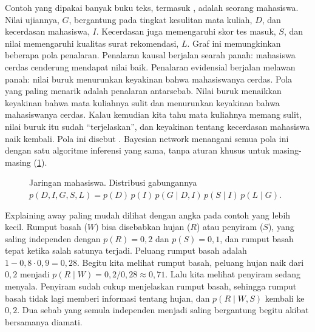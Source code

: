 Contoh yang dipakai banyak buku teks, termasuk \citet{koller2009}, adalah seorang mahasiswa. Nilai
ujiannya, $G$, bergantung pada tingkat kesulitan mata kuliah, $D$, dan kecerdasan mahasiswa, $I$.
Kecerdasan juga memengaruhi skor tes masuk, $S$, dan nilai memengaruhi kualitas surat rekomendasi,
$L$. Graf ini memungkinkan beberapa pola penalaran. Penalaran kausal berjalan searah panah: mahasiswa
cerdas cenderung mendapat nilai baik. Penalaran evidensial berjalan melawan panah: nilai buruk
menurunkan keyakinan bahwa mahasiswanya cerdas. Pola yang paling menarik adalah penalaran
antarsebab. Nilai buruk menaikkan keyakinan bahwa mata kuliahnya sulit dan menurunkan keyakinan
bahwa mahasiswanya cerdas. Kalau kemudian kita tahu mata kuliahnya memang sulit, nilai buruk
itu sudah ``terjelaskan'', dan keyakinan tentang kecerdasan mahasiswa naik kembali. Pola ini
disebut . Bayesian network menangani semua pola ini dengan satu algoritme
inferensi yang sama, tanpa aturan khusus untuk masing-masing (\cref{fig:mahasiswa}).

\begin{figure}[ht]
\centering
{}
\caption{Jaringan mahasiswa. Distribusi gabungannya
$p(D,I,G,S,L)=p(D)\,p(I)\,p(G\mid D,I)\,p(S\mid I)\,p(L\mid G)$.}
\label{fig:mahasiswa}
\end{figure}

Explaining away paling mudah dilihat dengan angka pada contoh yang lebih kecil. Rumput basah ($W$) bisa disebabkan
hujan ($R$) atau penyiram ($S$), yang saling independen dengan $p(R)=0{,}2$ dan $p(S)=0{,}1$, dan rumput basah tepat
ketika salah satunya terjadi. Peluang rumput basah adalah $1-0{,}8\cdot0{,}9=0{,}28$. Begitu kita melihat rumput basah,
peluang hujan naik dari $0{,}2$ menjadi $p(R\mid W)=0{,}2/0{,}28\approx0{,}71$. Lalu kita melihat penyiram sedang menyala.
Penyiram sudah cukup menjelaskan rumput basah, sehingga rumput basah tidak lagi memberi informasi tentang hujan, dan
$p(R\mid W,S)$ kembali ke $0{,}2$. Dua sebab yang semula independen menjadi saling bergantung begitu akibat bersamanya
diamati.

